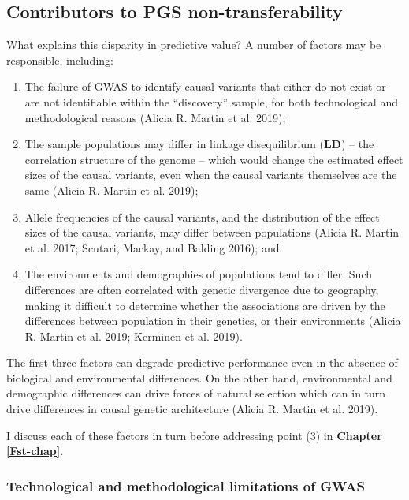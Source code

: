 \documentclass[
]{book}
\begin{document}
\hypertarget{contributors-to-pgs-non-transferability}{%
\subsection{Contributors to PGS non-transferability}\label{contributors-to-pgs-non-transferability}}

What explains this disparity in predictive value? A number of factors may be responsible, including:

\begin{enumerate}
\def\labelenumi{\arabic{enumi}.}
\item
  The failure of GWAS to identify causal variants that either do not exist or are not identifiable within the ``discovery'' sample, for both technological and methodological reasons (Alicia R. Martin et al. 2019);
\item
  The sample populations may differ in linkage disequilibrium (\textbf{LD}) -- the correlation structure of the genome -- which would change the estimated effect sizes of the causal variants, even when the causal variants themselves are the same (Alicia R. Martin et al. 2019);
\item
  Allele frequencies of the causal variants, and the distribution of the effect sizes of the causal variants, may differ between populations (Alicia R. Martin et al. 2017; Scutari, Mackay, and Balding 2016); and
\item
  The environments and demographies of populations tend to differ. Such differences are often correlated with genetic divergence due to geography, making it difficult to determine whether the associations are driven by the differences between population in their genetics, or their environments (Alicia R. Martin et al. 2019; Kerminen et al. 2019).
\end{enumerate}

The first three factors can degrade predictive performance even in the absence of biological and environmental differences. On the other hand, environmental and demographic differences can drive forces of natural selection which can in turn drive differences in causal genetic architecture (Alicia R. Martin et al. 2019).

I discuss each of these factors in turn before addressing point (3) in \textbf{Chapter \ref{Fst-chap}}.

\hypertarget{fst-discovery-sec}{%
\subsubsection{Technological and methodological limitations of GWAS}\label{fst-discovery-sec}}
\end{document}
